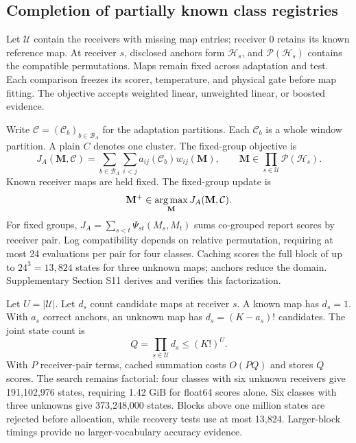 \subsection{Completion of partially known class registries}\label{sec:partial_registry}
Let $\mathcal U$ contain the receivers with missing map entries; receiver 0 retains its known reference map. At receiver $s$, disclosed anchors form $\mathcal H_s$, and $\mathcal P(\mathcal H_s)$ contains the compatible permutations. Maps remain fixed across adaptation and test. Each comparison freezes its scorer, temperature, and physical gate before map fitting. The objective accepts weighted linear, unweighted linear, or boosted evidence.

Write $\mathcal C=(\mathcal C_b)_{b\in\mathcal B_A}$ for the adaptation partitions. Each $\mathcal C_b$ is a whole window partition. A plain $C$ denotes one cluster. The fixed-group objective is
\begin{equation}
 J_A(\mathbf M,\mathcal C)=\sum_{b\in\mathcal B_A}\sum_{i<j}
 a_{ij}(\mathcal C_b)w_{ij}(\mathbf M),\qquad
 \mathbf M\in\prod_{s\in\mathcal U}\mathcal P(\mathcal H_s).
 \label{eq:partial_objective}
\end{equation}
Known receiver maps are held fixed. The fixed-group update is
\begin{equation}
 \mathbf M^+\in\operatorname*{arg\,max}_{\mathbf M}J_A(\mathbf M,\mathcal C).
 \label{eq:partial_update}
\end{equation}
For fixed groups, $J_A=\sum_{s<t}\Psi_{st}(M_s,M_t)$ sums co-grouped report scores by receiver pair. Log compatibility depends on relative permutation, requiring at most 24 evaluations per pair for four classes. Caching scores the full block of up to $24^3=13{,}824$ states for three unknown maps; anchors reduce the domain. Supplementary Section S11 derives and verifies this factorization.

Let $U=|\mathcal U|$. Let $d_s$ count candidate maps at receiver $s$. A known map has $d_s=1$. With $a_s$ correct anchors, an unknown map has $d_s=(K-a_s)!$ candidates. The joint state count is
\[
 Q=\prod_{s\in\mathcal U}d_s\leq(K!)^U.
\]
With $P$ receiver-pair terms, cached summation costs $O(PQ)$ and stores $Q$ scores. The search remains factorial: four classes with six unknown receivers give 191,102,976 states, requiring 1.42 GiB for float64 scores alone. Six classes with three unknowns give 373,248,000 states. Blocks above one million states are rejected before allocation, while recovery tests use at most 13,824. Larger-block timings provide no larger-vocabulary accuracy evidence.

